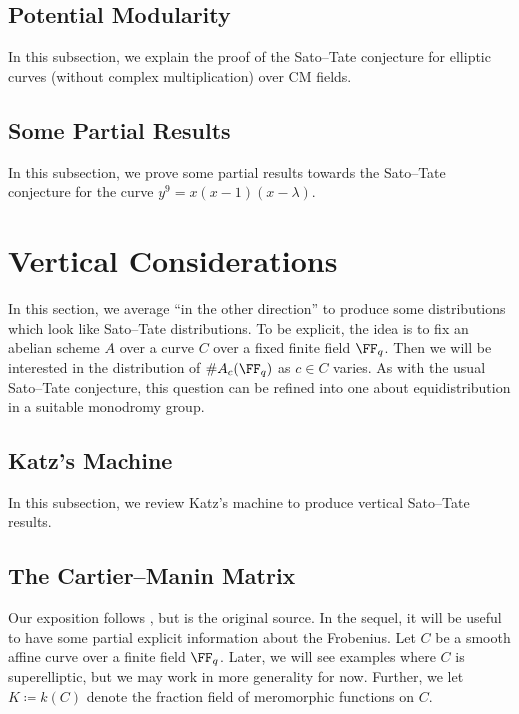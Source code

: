 \documentclass[../thesis.tex]{subfiles}
\begin{document}
\subsection{Potential Modularity}
In this subsection, we explain the proof of the Sato--Tate conjecture for elliptic curves (without complex multiplication) over CM fields.\todo{}

\subsection{Some Partial Results}
In this subsection, we prove some partial results towards the Sato--Tate conjecture for the curve $y^9=x(x-1)(x-\lambda)$.\todo{}

\section{Vertical Considerations}
In this section, we average ``in the other direction'' to produce some distributions which look like Sato--Tate distributions. To be explicit, the idea is to fix an abelian scheme $A$ over a curve $C$ over a fixed finite field $\FF_q$. Then we will be interested in the distribution of $\#A_c(\FF_q)$ as $c\in C$ varies. As with the usual Sato--Tate conjecture, this question can be refined into one about equidistribution in a suitable monodromy group.

\subsection{Katz's Machine}
In this subsection, we review Katz's machine to produce vertical Sato--Tate results.\todo{}

\subsection{The Cartier--Manin Matrix}
Our exposition follows \cite{sutherland-superelliptic}, but \cite{serre-cartier-manin} is the original source. In the sequel, it will be useful to have some partial explicit information about the Frobenius. Let $C$ be a smooth affine curve over a finite field $\FF_q$. Later, we will see examples where $C$ is superelliptic, but we may work in more generality for now. Further, we let $K\coloneqq k(C)$ denote the fraction field of meromorphic functions on $C$.
\end{document}
